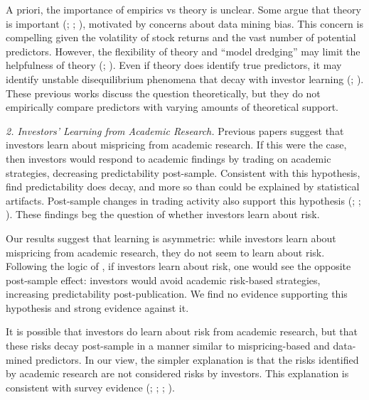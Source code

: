 A priori, the importance of empirics vs theory is unclear. Some argue that theory is important (\citealt{cochrane2009asset}; \citealt{harvey2017presidential}; \citealt{fama2018choosing}), motivated by concerns about data mining bias. This concern is compelling given the volatility of stock returns and the vast number of potential predictors. However, the flexibility of theory and ``model dredging'' may limit the helpfulness of theory (\citealt{sonnenschein1972market}; \citealt{fama1991efficient}). Even if theory does identify true predictors, it may identify unstable disequilibrium phenomena that decay with investor learning (\citealt{cochrane1999portfolio}; \citealt{mclean2016does}). These previous works discuss the question theoretically, but they do not empirically compare predictors with varying amounts of theoretical support.

\textit{2. Investors' Learning from Academic Research.} Previous papers suggest that investors learn about mispricing from academic research. If this were the case, then investors would respond to academic findings by trading on academic strategies, decreasing predictability post-sample. Consistent with this hypothesis, \citet{mclean2016does} find predictability does decay, and more so than could be explained by statistical artifacts. Post-sample changes in trading activity also support this hypothesis (\citealt{mclean2016does}; \citealt{calluzzo2019anomalies}; \citealt{mclean2020taking}). These findings beg the question of whether investors learn about risk. 

Our results suggest that learning is asymmetric: while investors learn about mispricing from academic research, they do not seem to learn about risk. Following the logic of \citet{mclean2016does}, if investors learn about risk, one would see the opposite post-sample effect: investors would avoid academic risk-based strategies, increasing predictability post-publication. We find no evidence supporting this hypothesis and strong evidence against it.

It is possible that investors do learn about risk from academic research, but that these risks decay post-sample in a manner similar to mispricing-based and data-mined predictors. In our view, the simpler explanation is that the risks identified by academic research are not considered risks by investors. This explanation is consistent with survey evidence (\citealt{doran2007really}; \citealt{mukhlynina2020choice}; \citealt{chinco2022new}; \citealt{bender2022millionaires}).

